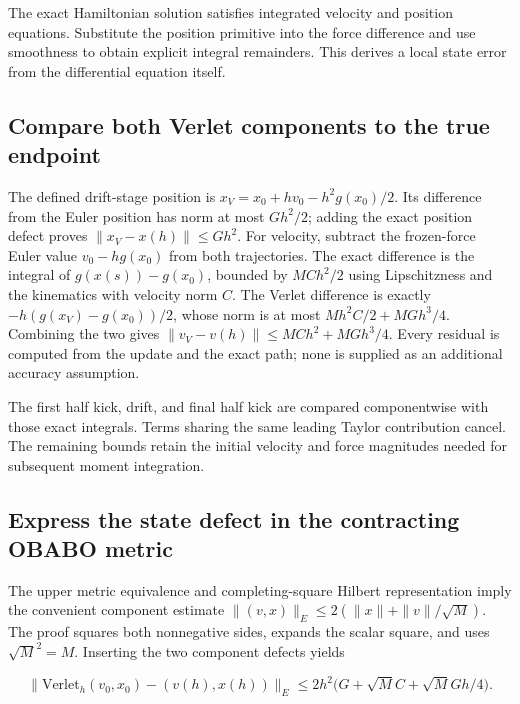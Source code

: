 \documentclass[11pt,a4paper]{report}
\begin{document}
The exact Hamiltonian solution satisfies integrated velocity and position equations. Substitute the position primitive into the force difference and use smoothness to obtain explicit integral remainders. This derives a local state error from the differential equation itself.

\subsection{\texorpdfstring{Compare both Verlet components to the true endpoint}{Compare both Verlet components to the true endpoint}}
\label{report-step-KineticLangevin-VerletLocal-lean-2}


The defined drift-stage position is \(x_V=x_0+hv_0-h^2g(x_0)/2\). Its difference from the Euler position has norm at most \(Gh^2/2\); adding the exact position defect proves \(\|x_V-x(h)\|\le Gh^2\). For velocity, subtract the frozen-force Euler value \(v_0-hg(x_0)\) from both trajectories. The exact difference is the integral of \(g(x(s))-g(x_0)\), bounded by \(MC h^2/2\) using Lipschitzness and the kinematics with velocity norm \(C\). The Verlet difference is exactly \(-h(g(x_V)-g(x_0))/2\), whose norm is at most \(Mh^2C/2+MGh^3/4\). Combining the two gives \(\|v_V-v(h)\|\le MC h^2+MGh^3/4\). Every residual is computed from the update and the exact path; none is supplied as an additional accuracy assumption.



The first half kick, drift, and final half kick are compared componentwise with those exact integrals. Terms sharing the same leading Taylor contribution cancel. The remaining bounds retain the initial velocity and force magnitudes needed for subsequent moment integration.

\subsection{\texorpdfstring{Express the state defect in the contracting OBABO metric}{Express the state defect in the contracting OBABO metric}}
\label{report-step-KineticLangevin-VerletLocal-lean-3}


The upper metric equivalence and completing-square Hilbert representation imply the convenient component estimate \(\|(v,x)\|_E\le2(\|x\|+\|v\|/\sqrt M)\). The proof squares both nonnegative sides, expands the scalar square, and uses \(\sqrt M^2=M\). Inserting the two component defects yields

\[\|\mathrm{Verlet}_h(v_0,x_0)-(v(h),x(h))\|_E\le2h^2\bigl(G+\sqrt M C+\sqrt M G h/4\bigr).\]
\end{document}
